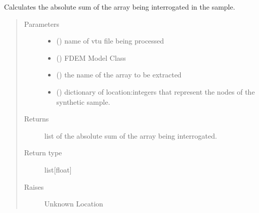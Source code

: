 \documentclass[letterpaper,10pt,english]{sphinxmanual}
\begin{document}
\begin{fulllineitems}
\label{\detokenize{openfdem:openfdem.rotary_ds_thread_pool_generators.abs_sum_array}}
Calculates the absolute sum of the array being interrogated in the sample.
\begin{quote}\begin{description}
\item[{Parameters}] \leavevmode\begin{itemize}
\item {} 
 () \textendash{} name of vtu file being processed

\item {} 
 ({\hyperref[\detokenize{openfdem:openfdem.openfdem.Model}]{}}) \textendash{} FDEM Model Class

\item {} 
 () \textendash{} the name of the array to be extracted

\item {} 
 (\sphinxstyleliteralemphasis{\sphinxupquote{{[}}}\sphinxstyleliteralemphasis{\sphinxupquote{, }}\sphinxstyleliteralemphasis{\sphinxupquote{{]}}}) \textendash{} dictionary of location:integers that represent the nodes of the synthetic sample.

\end{itemize}

\item[{Returns}] \leavevmode
list of the absolute sum of the array being interrogated.

\item[{Return type}] \leavevmode
list{[}float{]}

\item[{Raises}] \leavevmode
{} \textendash{} Unknown Location

\end{description}\end{quote}

\end{fulllineitems}
\end{document}
